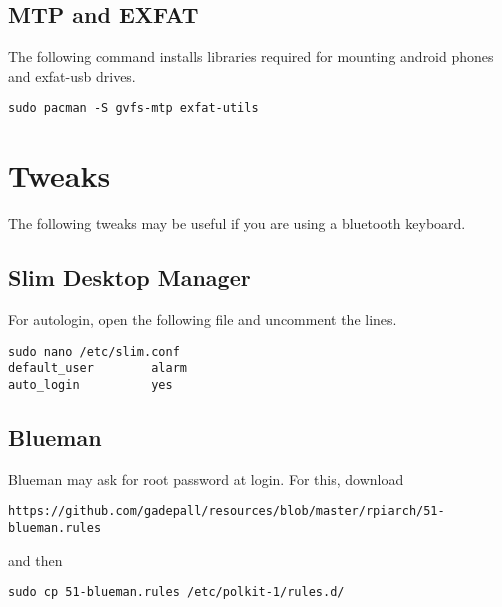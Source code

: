 \documentclass[journal,12pt,twocolumn]{IEEEtran}
\begin{document}
\subsection{MTP and EXFAT}
The following command installs libraries required for mounting android phones and exfat-usb drives.
\begin{lstlisting}
sudo pacman -S gvfs-mtp exfat-utils
\end{lstlisting}
\section{Tweaks}
The following tweaks may be useful if you are using a bluetooth keyboard.
\subsection{Slim Desktop Manager}
For autologin, open the following file and uncomment the lines.
\begin{lstlisting}
sudo nano /etc/slim.conf
default_user        alarm
auto_login          yes
\end{lstlisting}
\subsection{Blueman}
Blueman may ask for root password at login.  For this, download
\begin{lstlisting}
https://github.com/gadepall/resources/blob/master/rpiarch/51-blueman.rules
\end{lstlisting}
and then
\begin{lstlisting}
sudo cp 51-blueman.rules /etc/polkit-1/rules.d/
\end{lstlisting}

%
%
%
%
%
%
%
%

%



% 
% 
%
% 

\end{document}
